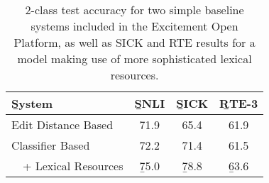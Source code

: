 %

%
%

\begin{table}
\begin{center}
\def\t#1{\small{#1}}
\begin{tabular}{l@{\hskip \colspaceL}c@{\hskip \colspaceL}c@{\hskip \colspaceL}c}
\toprule
\b{System} & \b{SNLI} & \b{SICK} & \b{RTE-3} \\
\midrule
\t{Edit Distance Based}            & \t{71.9} & \t{65.4} & \t{61.9} \\
\t{Classifier Based}               & \t{72.2} & \t{71.4} & \t{61.5} \\
\t{$~~~$ + Lexical Resources} & \b{75.0} & \b{78.8} & \b{63.6} \\
\bottomrule
\end{tabular}
\end{center}
\caption{
\label{tab:eopresults}
2-class test accuracy for two simple baseline systems included in the
  Excitement Open Platform, as well as SICK and RTE results for
  a model making use of more sophisticated lexical resources.
}
\end{table}
%
%

